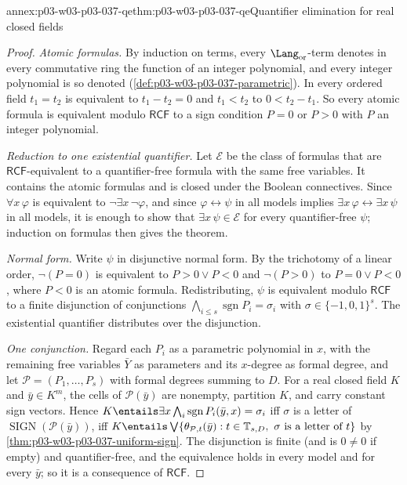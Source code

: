 \begin{annexitem}{annex:p03-w03-p03-037-qe}{thm:p03-w03-p03-037-qe}{Quantifier elimination for real closed fields}
\begin{proof}
\emph{Atomic formulas.}  By induction on terms, every
\(\Lang_{\mathrm{or}}\)-term denotes in every commutative ring the function of
an integer polynomial, and every integer polynomial is so denoted
(\cref{def:p03-w03-p03-037-parametric}).  In every ordered field
\(t_1=t_2\) is equivalent to \(t_1-t_2=0\) and \(t_1<t_2\) to
\(0<t_2-t_1\).  So every atomic formula is equivalent modulo
\(\mathsf{RCF}\) to a sign condition \(P=0\) or \(P>0\) with \(P\) an integer
polynomial.

\emph{Reduction to one existential quantifier.}  Let \(\mathcal E\) be the
class of formulas that are \(\mathsf{RCF}\)-equivalent to a quantifier-free
formula with the same free variables.  It contains the atomic formulas and
is closed under the Boolean connectives.  Since \(\forall x\,\varphi\) is
equivalent to \(\neg\exists x\,\neg\varphi\), and since
\(\varphi\leftrightarrow\psi\) in all models implies
\(\exists x\,\varphi\leftrightarrow\exists x\,\psi\) in all models, it is
enough to show that \(\exists x\,\psi\in\mathcal E\) for every
quantifier-free \(\psi\); induction on formulas then gives the theorem.

\emph{Normal form.}  Write \(\psi\) in disjunctive normal form.  By the
trichotomy of a linear order, \(\neg(P=0)\) is equivalent to
\(P>0\vee P<0\) and \(\neg(P>0)\) to \(P=0\vee P<0\), where \(P<0\) is an
atomic formula.  Redistributing, \(\psi\) is equivalent modulo
\(\mathsf{RCF}\) to a finite disjunction of conjunctions
\(\bigwedge_{i\leq s}\operatorname{sgn}P_i=\sigma_i\) with
\(\sigma\in\{-1,0,1\}^s\).  The existential quantifier distributes over the
disjunction.

\emph{One conjunction.}  Regard each \(P_i\) as a parametric polynomial in
\(x\), with the remaining free variables \(\bar Y\) as parameters and its
\(x\)-degree as formal degree, and let \(\mathcal P=(P_1,\dots,P_s)\) with
formal degrees summing to \(D\).  For a real closed field \(K\) and
\(\bar y\in K^m\), the cells of \(\mathcal P(\bar y)\) are nonempty, partition
\(K\), and carry constant sign vectors.  Hence
\(K\entails\exists x\bigwedge_i\operatorname{sgn}P_i(\bar y,x)=\sigma_i\)
iff \(\sigma\) is a letter of \(\operatorname{SIGN}(\mathcal P(\bar y))\), iff
\(K\entails\bigvee\{\theta_{\mathcal P,t}(\bar y):t\in\mathbb T_{s,D},\
\sigma\text{ is a letter of }t\}\) by
\cref{thm:p03-w03-p03-037-uniform-sign}.  The disjunction is finite (and is
\(0\neq0\) if empty) and quantifier-free, and the equivalence holds in every
model and for every \(\bar y\); so it is a consequence of \(\mathsf{RCF}\).
\end{proof}
\end{annexitem}

